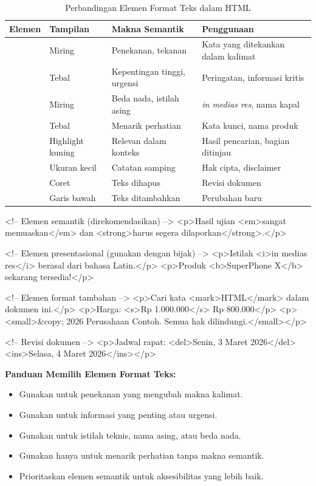 \begin{table}[htbp]
\centering
\begin{tabular}{|P{2cm}|P{2cm}|P{3.5cm}|P{4cm}|}
\hline
\textbf{Elemen} & \textbf{Tampilan} & \textbf{Makna Semantik} & \textbf{Penggunaan} \\
\hline
{} & Miring & Penekanan, tekanan & Kata yang ditekankan dalam kalimat \\
\hline
{} & Tebal & Kepentingan tinggi, urgensi & Peringatan, informasi kritis \\
\hline
{} & Miring & Beda nada, istilah asing & \textit{in medias res}, nama kapal \\
\hline
{} & Tebal & Menarik perhatian & Kata kunci, nama produk \\
\hline
{} & Highlight kuning & Relevan dalam konteks & Hasil pencarian, bagian ditinjau \\
\hline
{} & Ukuran kecil & Catatan samping & Hak cipta, disclaimer \\
\hline
{} & Coret & Teks dihapus & Revisi dokumen \\
\hline
{} & Garis bawah & Teks ditambahkan & Perubahan baru \\
\hline
\end{tabular}
\caption{Perbandingan Elemen Format Teks dalam HTML}
\label{tab:text-formatting}
\end{table}

\begin{webcode}[language=HTML, caption={Contoh Elemen Format Teks}]
<!-- Elemen semantik (direkomendasikan) -->
<p>Hasil ujian <em>sangat memuaskan</em> dan 
   <strong>harus segera dilaporkan</strong>.</p>

<!-- Elemen presentasional (gunakan dengan bijak) -->
<p>Istilah <i>in medias res</i> berasal dari bahasa Latin.</p>
<p>Produk <b>SuperPhone X</b> sekarang tersedia!</p>

<!-- Elemen format tambahan -->
<p>Cari kata <mark>HTML</mark> dalam dokumen ini.</p>
<p>Harga: <s>Rp 1.000.000</s> Rp 800.000</p>
<p><small>&copy; 2026 Perusahaan Contoh. 
   Semua hak dilindungi.</small></p>

<!-- Revisi dokumen -->
<p>Jadwal rapat: <del>Senin, 3 Maret 2026</del> 
   <ins>Selasa, 4 Maret 2026</ins></p>
\end{webcode}

\begin{catatan}
\textbf{Panduan Memilih Elemen Format Teks:}
\begin{itemize}[leftmargin=*]
  \item Gunakan  untuk penekanan yang mengubah makna kalimat.
  \item Gunakan  untuk informasi yang penting atau urgensi.
  \item Gunakan  untuk istilah teknis, nama asing, atau beda nada.
  \item Gunakan  hanya untuk menarik perhatian tanpa makna semantik.
  \item Prioritaskan elemen semantik untuk aksesibilitas yang lebih baik.
\end{itemize}
\end{catatan}

